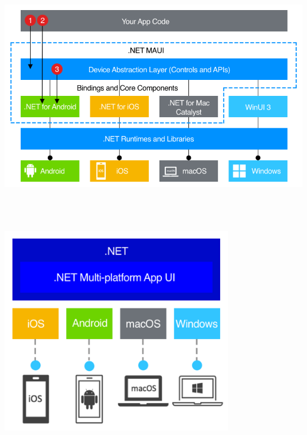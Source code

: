 \documentclass[14pt]{extarticle}
\begin{document}
\includegraphics[height=100mm,width=\linewidth,keepaspectratio]{maui-architecture.png}
\vfil

\begin{center}
    \includegraphics[height=100mm,width=100mm,keepaspectratio]{maui-overview.png}
\end{center}

\newpage
\end{document}
